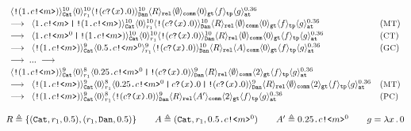 {\footnotesize
\[
\begin{array}{ll}
\Cella{\comp{(\qsend{1}{c}{m}})}{10}{\cn{Cat}}\Cella{0}{10}{r_1}
\Cella{\comp{(\qrev{c}{x}.0)}}{10}{\cn{Dan}} 
\qcell{R}{\cn{rel}}
\qcell{\emptyset}{\cn{comm}}
\qcell{0}{\cn{gt}}
\qcell{f}{\cn{tp}}
\pcell{g}{0.36}{\cn{at}}
\\[0.2em]
\longrightarrow\;\;
\Cella{\parl{\qsend{1}{c}{m}}{\comp{(\qsend{1}{c}{m}})}}{10}{\cn{Cat}}
\Cella{0}{10}{r_1}
\Cella{\comp{(\qrev{c}{x}.0)}}{10}{\cn{Dan}} 
\qcell{R}{\cn{rel}}
\qcell{\emptyset}{\cn{comm}}
\qcell{0}{\cn{gt}}
\qcell{f}{\cn{tp}}
\pcell{g}{0.36}{\cn{at}}
&
(\rulelab{MT})
\\[0.2em]
\longrightarrow\;\;
\Cella{\parl{\qsend{1}{c}{m}^0}{\comp{(\qsend{1}{c}{m}})}}{10}{\cn{Cat}}
\Cella{0}{10}{r_1}
\Cella{\comp{(\qrev{c}{x}.0)}}{10}{\cn{Dan}} 
\qcell{R}{\cn{rel}}
\qcell{\emptyset}{\cn{comm}}
\qcell{0}{\cn{gt}}
\qcell{f}{\cn{tp}}
\pcell{g}{0.36}{\cn{at}}
&
(\rulelab{CT})
\\[0.2em]
\longrightarrow\;\;
\Cella{\comp{(\qsend{1}{c}{m}})}{9}{\cn{Cat}}
\Cella{\qsend{0.5}{c}{m}^0}{9}{r_1}
\Cella{\comp{(\qrev{c}{x}.0)}}{10}{\cn{Dan}} 
\qcell{R}{\cn{rel}}
\qcell{A}{\cn{comm}}
\qcell{0}{\cn{gt}}
\qcell{f}{\cn{tp}}
\pcell{g}{0.36}{\cn{at}}
&(\rulelab{GC})
\\[0.2em]
\longrightarrow\;...\;\longrightarrow
\\[0.2em]
\Cella{\comp{(\qsend{1}{c}{m}})}{9}{\cn{Cat}}
\Cella{0}{8}{r_1}
\Cella{\parl{\qsend{0.25}{c}{m}^0}{\comp{(\qrev{c}{x}.0)}}}{9}{\cn{Dan}} 
\qcell{R}{\cn{rel}}
\qcell{\emptyset}{\cn{comm}}
\qcell{2}{\cn{gt}}
\qcell{f}{\cn{tp}}
\pcell{g}{0.36}{\cn{at}}
\\[0.2em]
\longrightarrow\;\;
\Cella{\comp{(\qsend{1}{c}{m}})}{9}{\cn{Cat}}
\Cella{0}{8}{r_1}
\Cella{\parl{\qsend{0.25}{c}{m}^0}{\parl{\qrev{c}{x}.0}{\comp{(\qrev{c}{x}.0)}}}}{9}{\cn{Dan}} 
\qcell{R}{\cn{rel}}
\qcell{\emptyset}{\cn{comm}}
\qcell{2}{\cn{gt}}
\qcell{f}{\cn{tp}}
\pcell{g}{0.36}{\cn{at}}
&
(\rulelab{MT})
\\[0.2em]
\longrightarrow\;\;
\Cella{\comp{(\qsend{1}{c}{m}})}{9}{\cn{Cat}}
\Cella{0}{8}{r_1}
\Cella{\comp{(\qrev{c}{x}.0)}}{9}{\cn{Dan}} 
\qcell{R}{\cn{rel}}
\qcell{A'}{\cn{comm}}
\qcell{2}{\cn{gt}}
\qcell{f}{\cn{tp}}
\pcell{g}{0.36}{\cn{at}}
&
(\rulelab{PC})
\end{array}
\]
}
{\footnotesize
\begin{center}
$R\triangleq\{(\cn{Cat},r_1,0.5), (r_1,\cn{Dan},0.5)\}
\qquad
A\triangleq (\cn{Cat},r_1,\qsend{0.5}{c}{m}^0)
\qquad
A'\triangleq \qsend{0.25}{c}{m}^0
\qquad
g=\lambda x\,.\,0
$
\end{center}
}

